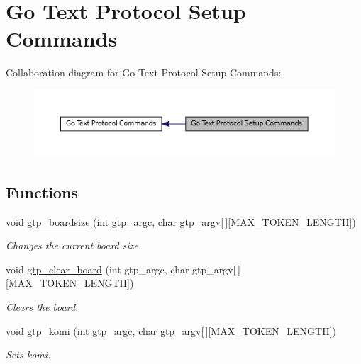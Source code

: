 \hypertarget{group___g_t_p___setup___commands}{
\section{Go Text Protocol Setup Commands}
\label{group___g_t_p___setup___commands}
}


Collaboration diagram for Go Text Protocol Setup Commands:\nopagebreak
\begin{figure}[H]
\begin{center}
\leavevmode
\includegraphics[width=400pt]{group___g_t_p___setup___commands}
\end{center}
\end{figure}


\subsection*{Functions}
\begin{DoxyCompactItemize}
\item 
void \hyperlink{group___g_t_p___setup___commands_ga79e2fa5bdce2dd440754746a2e35dd24}{gtp\_\-boardsize} (int gtp\_\-argc, char gtp\_\-argv\mbox{[}$\,$\mbox{]}\mbox{[}MAX\_\-TOKEN\_\-LENGTH\mbox{]})
\begin{DoxyCompactList}\small\item\em Changes the current board size. \item\end{DoxyCompactList}\item 
void \hyperlink{group___g_t_p___setup___commands_ga2a539d6423ba407b126487e12a6a222b}{gtp\_\-clear\_\-board} (int gtp\_\-argc, char gtp\_\-argv\mbox{[}$\,$\mbox{]}\mbox{[}MAX\_\-TOKEN\_\-LENGTH\mbox{]})
\begin{DoxyCompactList}\small\item\em Clears the board. \item\end{DoxyCompactList}\item 
void \hyperlink{group___g_t_p___setup___commands_ga9f823dc0dc9c21fabf4ba223fc515682}{gtp\_\-komi} (int gtp\_\-argc, char gtp\_\-argv\mbox{[}$\,$\mbox{]}\mbox{[}MAX\_\-TOKEN\_\-LENGTH\mbox{]})
\begin{DoxyCompactList}\small\item\em Sets komi. \item\end{DoxyCompactList}\end{DoxyCompactItemize}


